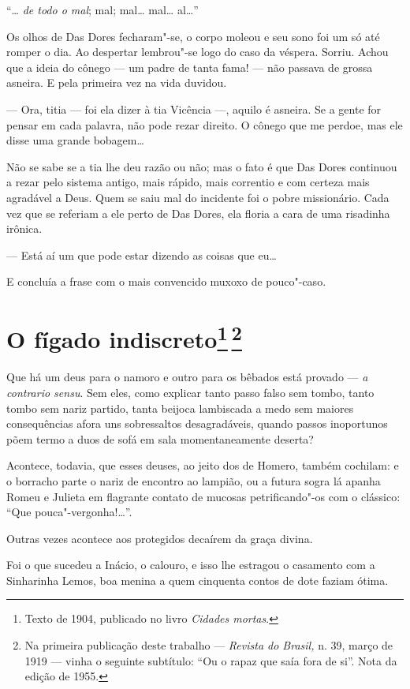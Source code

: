 ``\ldots{} \emph{de todo o mal}; mal; mal\ldots{} mal\ldots{} al\ldots{}''

Os olhos de Das Dores fecharam"-se, o corpo moleou e seu sono foi um só
até romper o dia. Ao despertar lembrou"-se logo do caso da véspera.
Sorriu. Achou que a ideia do cônego --- um padre de tanta fama! --- não
passava de grossa asneira. E pela primeira vez na vida duvidou.

--- Ora, titia --- foi ela dizer à tia Vicência ---, aquilo é asneira.
Se a gente for pensar em cada palavra, não pode rezar direito. O cônego
que me perdoe, mas ele disse uma grande bobagem\ldots{}

Não se sabe se a tia lhe deu razão ou não; mas o fato é que Das Dores
continuou a rezar pelo sistema antigo, mais rápido, mais correntio e com
certeza mais agradável a Deus. Quem se saiu mal do incidente foi o pobre
missionário. Cada vez que se referiam a ele perto de Das Dores, ela
floria a cara de uma risadinha irônica.

--- Está aí um que pode estar dizendo as coisas que eu\ldots{}

E concluía a frase com o mais convencido muxoxo de pouco"-caso.

\chapter{O fígado indiscreto\footnote[*]{Texto de 1904, publicado no livro \emph{Cidades mortas}.}\,\footnote[**]{Na primeira publicação
  deste trabalho --- \emph{Revista do Brasil,} n. 39, março de 1919 ---
  vinha o seguinte subtítulo: ``Ou o rapaz que saía fora de si''. Nota
  da edição de 1955.}}

Que há um deus para o namoro e outro para os bêbados está provado ---
\emph{a contrario sensu}. Sem eles, como explicar tanto passo falso sem
tombo, tanto tombo sem nariz partido, tanta beijoca lambiscada a medo
sem maiores consequências afora uns sobressaltos desagradáveis, quando
passos inoportunos põem termo a duos de sofá em sala momentaneamente
deserta?

Acontece, todavia, que esses deuses, ao jeito dos de Homero, também
cochilam: e o borracho parte o nariz de encontro ao lampião, ou a futura
sogra lá apanha Romeu e Julieta em flagrante contato de mucosas
petrificando"-os com o clássico: ``Que pouca"-vergonha!\ldots{}''.

Outras vezes acontece aos protegidos decaírem da graça divina.

Foi o que sucedeu a Inácio, o calouro, e isso lhe estragou o casamento
com a Sinharinha Lemos, boa menina a quem cinquenta contos de dote
faziam ótima.

